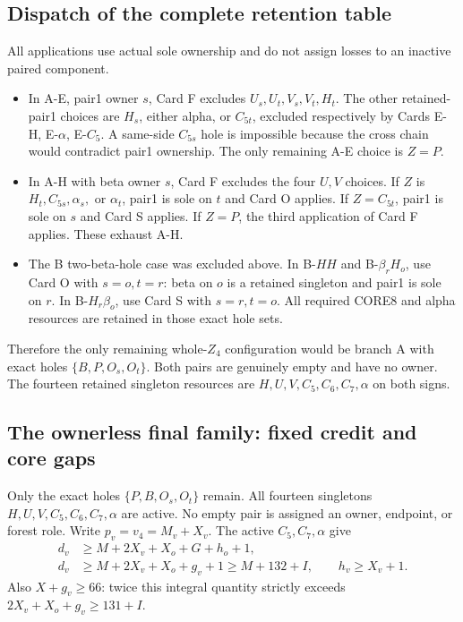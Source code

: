 \documentclass[11pt,letterpaper]{article}
\theoremstyle{definition}\newtheorem{definition}[theorem]{Definition}
\begin{document}
\subsection{Dispatch of the complete retention table}
All applications use actual sole ownership and do not assign losses to an inactive paired component.
\begin{itemize}
\item In A-E, pair1 owner $s$, Card F excludes $U_s,U_t,V_s,V_t,H_t$. The other retained-pair1 choices are $H_s$, either alpha, or $C_{5t}$, excluded respectively by Cards E-H, E-$\alpha$, E-$C_5$. A same-side $C_{5s}$ hole is impossible because the cross chain would contradict pair1 ownership. The only remaining A-E choice is $Z=P$.
\item In A-H with beta owner $s$, Card F excludes the four $U,V$ choices. If $Z$ is $H_t,C_{5s},\alpha_s,$ or $\alpha_t$, pair1 is sole on $t$ and Card O applies. If $Z=C_{5t}$, pair1 is sole on $s$ and Card S applies. If $Z=P$, the third application of Card F applies. These exhaust A-H.
\item The B two-beta-hole case was excluded above. In B-$HH$ and B-$\beta_rH_o$, use Card O with $s=o,t=r$: beta on $o$ is a retained singleton and pair1 is sole on $r$. In B-$H_r\beta_o$, use Card S with $s=r,t=o$. All required CORE8 and alpha resources are retained in those exact hole sets.
\end{itemize}
Therefore the only remaining whole-$Z_4$ configuration would be branch A with exact holes $\{B,P,O_s,O_t\}$. Both pairs are genuinely empty and have no owner. The fourteen retained singleton resources are $H,U,V,C_5,C_6,C_7,\alpha$ on both signs.


\subsection{The ownerless final family: fixed credit and core gaps}\label{sec:z4-final}
Only the exact holes $\{P,B,O_s,O_t\}$ remain. All fourteen singletons
$H,U,V,C_5,C_6,C_7,\alpha$ are active. No empty pair is assigned an owner, endpoint, or forest role.
Write $p_v=v_4=M_v+X_v$. The active $C_5,C_7,\alpha$ give
\begin{equation}\label{eq:z4-final-centres}
\begin{split}
 d_v&\ge M+2X_v+X_o+G+h_o+1,\\
 d_v&\ge M+2X_v+X_o+g_v+1\ge M+132+I,\qquad
 h_v\ge X_v+1.
\end{split}
\end{equation}
Also $X+g_v\ge66$: twice this integral quantity strictly exceeds
$2X_v+X_o+g_v\ge131+I$.
\end{document}
